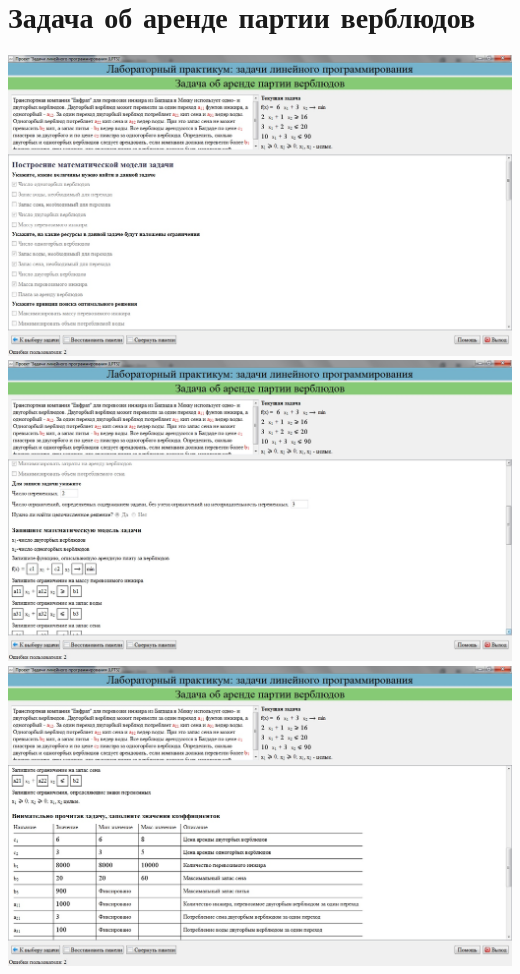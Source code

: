 \section{Задача об аренде партии верблюдов}

\includegraphics[width=\linewidth]{om_hw_02/images/2_1.jpg}\\
\includegraphics[width=\linewidth]{om_hw_02/images/2_2.jpg}\\
\includegraphics[width=\linewidth]{om_hw_02/images/2_3.jpg}\\
